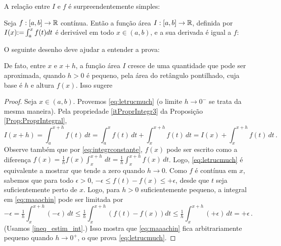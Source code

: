 A relação entre $I$ e $f$ é surpreendentemente simples:
\begin{teo}\label{Teo:TFC}
 Seja $f:[a,b]\to \mathbb{R}$ contínua. Então a função área $I:[a,b]\to \mathbb{R}$,
definida por $I(x){:=} \int_a^xf(t)dt$
é derivável em todo $x\in (a,b)$, e a sua derivada é igual a $f$:
\end{teo}
O seguinte desenho deve ajudar a entender a prova:
\begin{center}
\begin{bmlimage}\end{bmlimage}
\end{center}
De fato, entre $x$ e $x+h$, a função área $I$ cresce de uma
quantidade que pode ser aproximada, quando $h>0$ é pequeno, 
pela área do retângulo pontilhado, cuja base é $h$ e altura $f(x)$.
Isso sugere 
\begin{proof}
Seja $x\in (a,b)$. Provemos \eqref{eq:letrucmuch} 
(o limite $h\to 0^-$ se trata da mesma maneira).
Pela propriedade \eqref{itProprIntegr3} da Proposição \ref{Prop:ProprIntegral},
$$I(x+h)=\int_a^{x+h}f(t)\,dt=\int_a^xf(t)\,dt+\int_{x}^{x+h}f(t)\,dt=
I(x)+\int_{x}^{x+h}f(t)\,dt\,.$$
Observe também que por \eqref{eq:integrconstante}, $f(x)$ pode
ser escrito como a diferença
$f(x)=\frac{1}{h}f(x)\int_x^{x+h}\,dt=\frac{1}{h}\int_x^{x+h}f(x)\,dt$.
Logo, \eqref{eq:letrucmuch} é equivalente a mostrar que
tende a zero quando $h\to 0$.
Como $f$ é contínua em $x$, sabemos que para todo $\epsilon>0$,
$-\epsilon\leq f(t)-f(x)\leq +\epsilon$, desde que $t$ seja suficientemente
perto de $x$.
Logo, para $h>0$ suficientemente pequeno, a integral em
\eqref{eq:maaachin} pode ser limitada por 
$$
-\epsilon =\tfrac1h\int_x^{x+h}(-\epsilon)\,dt
\leq \tfrac{1}{h}\int_x^{x+h}(f(t)-f(x))dt\leq 
\tfrac1h\int_x^{x+h}(+\epsilon)\,dt=+\epsilon\,.
$$
(Usamos \eqref{ineq_estim_int}.)
Isso mostra que \eqref{eq:maaachin} fica arbitrariamente pequeno  quando $h\to
0^+$, o que prova \eqref{eq:letrucmuch}.
\end{proof}

